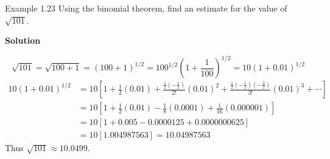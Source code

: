 \begin{example}{Example 1.23}
Using the binomial theorem, find an estimate for the value of $\sqrt{101}$.

\medskip\noindent\textbf{Solution}

\[
  \sqrt{101} = \sqrt{100+1} = (100+1)^{1/2} = 100^{1/2}\left(1+\frac{1}{100}\right)^{1/2} = 10\left(1+0.01\right)^{1/2}
\]
\begin{align*}
  10(1+0.01)^{1/2} &= 10\left[1 + \frac{1}{2}(0.01) + \frac{\tfrac{1}{2}\left(-\tfrac{1}{2}\right)}{2!}(0.01)^2 + \frac{\tfrac{1}{2}\left(-\tfrac{1}{2}\right)\left(-\tfrac{3}{2}\right)}{3!}(0.01)^3 + \cdots\right] \\
  &= 10\left[1 + \frac{1}{2}(0.01) - \frac{1}{8}(0.0001) + \frac{1}{16}(0.000001)\right] \\
  &= 10\left[1 + 0.005 - 0.0000125 + 0.0000000625\right] \\
  &= 10\left[1.004987563\right] = 10.04987563
\end{align*}
Thus $\sqrt{101} \approx 10.0499$.
\end{example}

